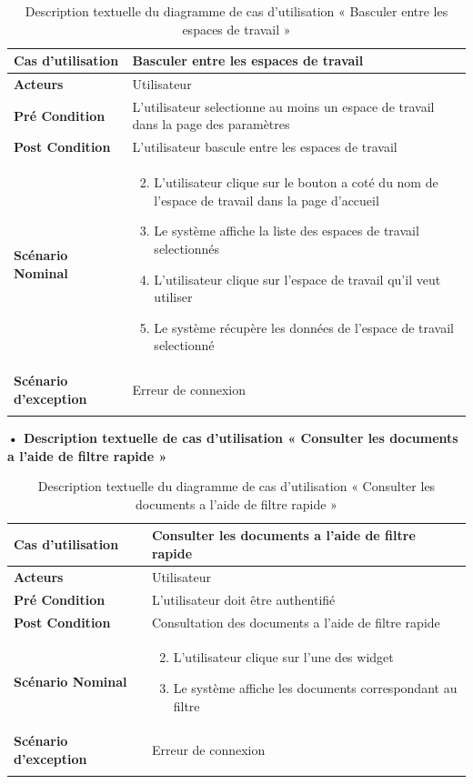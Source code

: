 \begin{longtable}{|p{5cm}|p{10cm}|}
  \hline
  \textbf{Cas d'utilisation}&Basculer entre les espaces de travail\\
  \hline
  \textbf{Acteurs}&Utilisateur\\
  \hline
  \textbf{Pré Condition}&L'utilisateur selectionne au moins un espace de travail dans la page des paramètres\\
  \hline
  \textbf{Post Condition}&L'utilisateur bascule entre les espaces de travail\\
  \hline
  \textbf{Scénario Nominal}&
  \vspace{-\baselineskip}
  \begin{enumerate}
    \setcounter{enumi}{1}
        \item L'utilisateur clique sur le bouton a coté du nom de l'espace de travail dans la page d'accueil
        \item Le système affiche la liste des espaces de travail selectionnés
        \item L'utilisateur clique sur l'espace de travail qu'il veut utiliser
        \item Le système récupère les données de l'espace de travail selectionné
  \end{enumerate}\\
  \hline
  \textbf{Scénario d'exception}&Erreur de connexion\\
  \hline
  \caption{Description textuelle du diagramme de cas d'utilisation « Basculer entre les espaces de travail »}
  \label{tab:use_case_basculer_espaces_travail}
  \end{longtable}


\textbf{•	Description textuelle de cas d'utilisation « Consulter les documents a l'aide de filtre rapide »}

\begin{longtable}{|p{5cm}|p{10cm}|}
\hline
\textbf{Cas d'utilisation}&Consulter les documents a l'aide de filtre rapide\\
\hline
\textbf{Acteurs}&Utilisateur \\
\hline
\textbf{Pré Condition}&L'utilisateur doit être authentifié\\
\hline
\textbf{Post Condition}&Consultation des documents a l'aide de filtre rapide\\
\hline
\textbf{Scénario Nominal}&
\vspace{-\baselineskip}
\begin{enumerate}
    \setcounter{enumi}{1}
      \item L'utilisateur clique sur l'une des widget
      \item Le système affiche les documents correspondant au filtre
\end{enumerate}\\
\hline
\textbf{Scénario d'exception}&Erreur de connexion\\
\hline
\caption{Description textuelle du diagramme de cas d'utilisation « Consulter les documents a l'aide de filtre rapide »}
\label{tab:use_case_consulter_documents_filtre_rapide}
\end{longtable}

